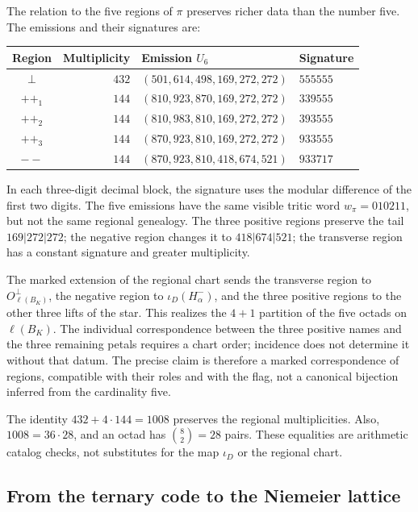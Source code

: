 The relation to the five regions of $\pi$ preserves richer data
than the number five. The emissions and their signatures are:
\begin{center}
\small
\begin{tabular}{@{}crll@{}}
\toprule
Region & Multiplicity & Emission $U_6$ & Signature \\
\midrule
$\perp$ & $432$ & $(501,614,498,169,272,272)$ & $555555$ \\
$++_1$ & $144$ & $(810,923,870,169,272,272)$ & $339555$ \\
$++_2$ & $144$ & $(810,983,810,169,272,272)$ & $393555$ \\
$++_3$ & $144$ & $(870,923,810,169,272,272)$ & $933555$ \\
$--$ & $144$ & $(870,923,810,418,674,521)$ & $933717$ \\
\bottomrule
\end{tabular}
\end{center}
In each three-digit decimal block, the signature uses the modular
difference of the first two digits. The five emissions have the
same visible tritic word $w_\pi=010211$, but not the same
regional genealogy. The three positive regions preserve the tail
$169|272|272$; the negative region changes it to $418|674|521$;
the transverse region has a constant signature and greater multiplicity.

The marked extension of the regional chart sends the transverse region
to $O_{\ell(B_K)}^\perp$, the negative region to $\iota_D(H^-_\alpha)$, and the
three positive regions to the other three lifts of the star. This
realizes the $4+1$ partition of the five octads on $\ell(B_K)$.
The individual correspondence between the three positive names and
the three remaining petals requires a chart order; incidence does not
determine it without that datum. The precise claim is therefore a
marked correspondence of regions, compatible with their roles and with
the flag, not a canonical bijection inferred from the cardinality five.

The identity $432+4\cdot144=1008$ preserves the regional
multiplicities. Also, $1008=36\cdot28$, and an octad has
$\binom82=28$ pairs. These equalities are arithmetic catalog
checks, not substitutes for the map $\iota_D$ or the regional chart.

\subsection{From the ternary code to the Niemeier lattice}
\label{exc:niemeier}

